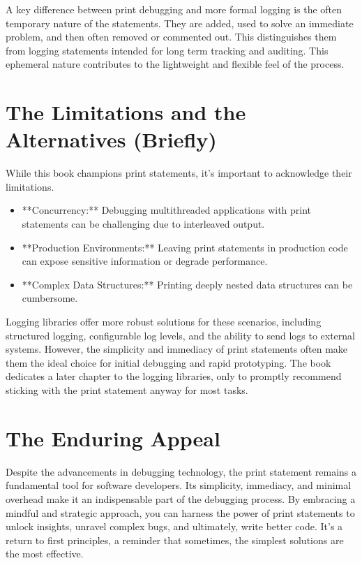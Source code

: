 \documentclass{article}
\begin{document}
A key difference between print debugging and more formal logging is the often temporary nature of the statements. They are added, used to solve an immediate problem, and then often removed or commented out. This distinguishes them from logging statements intended for long term tracking and auditing. This ephemeral nature contributes to the lightweight and flexible feel of the process.

\section{The Limitations and the Alternatives (Briefly)}

While this book champions print statements, it's important to acknowledge their limitations.

\begin{itemize}
\item{} **Concurrency:** Debugging multithreaded applications with print statements can be challenging due to interleaved output.
\item{} **Production Environments:** Leaving print statements in production code can expose sensitive information or degrade performance.
\item{} **Complex Data Structures:** Printing deeply nested data structures can be cumbersome.
\end{itemize}

Logging libraries offer more robust solutions for these scenarios, including structured logging, configurable log levels, and the ability to send logs to external systems. However, the simplicity and immediacy of print statements often make them the ideal choice for initial debugging and rapid prototyping. The book dedicates a later chapter to the logging libraries, only to promptly recommend sticking with the print statement anyway for most tasks.

\section{The Enduring Appeal}

Despite the advancements in debugging technology, the print statement remains a fundamental tool for software developers. Its simplicity, immediacy, and minimal overhead make it an indispensable part of the debugging process. By embracing a mindful and strategic approach, you can harness the power of print statements to unlock insights, unravel complex bugs, and ultimately, write better code. It's a return to first principles, a reminder that sometimes, the simplest solutions are the most effective.
\end{document}
